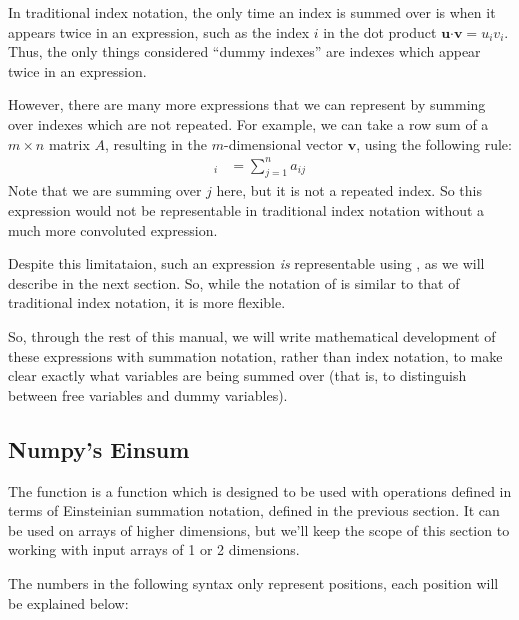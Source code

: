\begin{info}
In traditional index notation, the only time an index is summed over is when it appears twice in an expression, such as the index $i$ in the dot product $\mathbf{u} \boldsymbol{\cdot} \mathbf{v} = u_i v_i$. Thus, the only things considered ``dummy indexes'' are indexes which appear twice in an expression.

\noindent However, there are many more expressions that we can represent by summing over indexes which are not repeated. 
For example, we can take a row sum of a $m \times n$ matrix $A$, resulting in the $m$-dimensional vector $\mathbf{v}$, using the following rule:
\begin{align*}
	[v]_i &= \sum_{j=1}^{n} a_{ij}
\end{align*}
Note that we are summing over $j$ here, but it is not a repeated index. 
So this expression would not be representable in traditional index notation without a much more convoluted expression.

\noindent Despite this limitataion, such an expression \emph{is} representable using , as we will describe in the next section.
So, while the notation of   is similar to that of traditional index notation, it is more flexible. 

\noindent So, through the rest of this manual, we will write mathematical development of these expressions with summation notation, rather than index notation, to make clear exactly what variables are being summed over (that is, to distinguish between free variables and dummy variables).

\end{info}


\subsection*{Numpy's Einsum}

The function  is a function which is designed to be used with operations defined in terms of Einsteinian summation notation, defined in the previous section.
It can be used on arrays of higher dimensions, but we'll keep the scope of this section to working with input arrays of 1 or 2 dimensions. 

The numbers in the following syntax only represent positions, each position will be explained below:

\begin{center}
\end{center}

